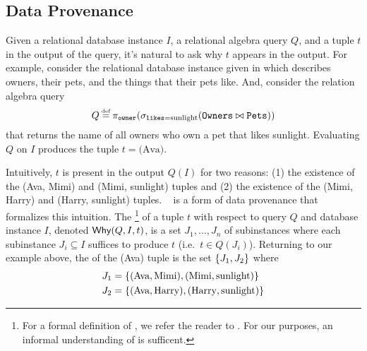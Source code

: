 \subsection{Data Provenance}
Given a relational database instance $I$, a relational algebra query $Q$, and a
tuple $t$ in the output of the query, it's natural to ask why $t$ appears in
the output. For example, consider the relational database instance given in
 which describes owners, their pets, and the things that
their pets like. And, consider the relation algebra query
\[
  Q \defeq \pi_{\ttt{owner}}(
             \sigma_{\ttt{likes} = \text{sunlight}}(
               \ttt{Owners} \join \ttt{Pets}
             )
           )
\]
that returns the name of all owners who own a pet that likes sunlight.
Evaluating $Q$ on $I$ produces the tuple $t = \text{(Ava)}$.

{}

Intuitively, $t$ is present in the output $Q(I)$ for two reasons: (1) the
existence of the (Ava, Mimi) and (Mimi, sunlight) tuples and (2) the existence
of the (Mimi, Harry) and (Harry, sunlight) tuples.
~\cite{buneman2001and, cheney2009provenance} is a
form of data provenance that formalizes this intuition. The
\whyprovenance{}\footnote{
  For a formal definition of \whyprovenance{}, we refer the reader to
  \cite{cheney2009provenance}. For our purposes, an informal understanding of
  \whyprovenance{} is sufficent.
}
of a tuple $t$ with respect to query $Q$ and database instance $I$, denoted
$\textsf{Why}(Q, I, t)$, is a set $J_1, \ldots, J_n$ of subinstances where each
subinstance $J_i \subseteq I$ suffices to produce $t$ (i.e.\ $t \in Q(J_i)$).
%
Returning to our example above, the \whyprovenance{} of the (Ava) tuple is the
set $\{J_1, J_2\}$ where
\begin{align*}
  J_1 &= \{(\text{Ava}, \text{Mimi}), (\text{Mimi}, \text{sunlight})\} \\
  J_2 &= \{(\text{Ava}, \text{Harry}), (\text{Harry}, \text{sunlight})\}
\end{align*}


